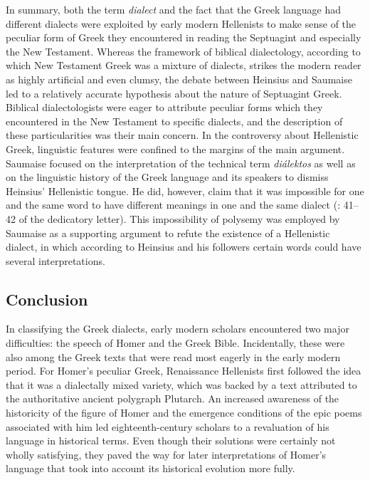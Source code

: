 \documentclass[output=paper]{langsci/langscibook}
\begin{document}
In summary, both the term \textit{dialect} and the fact that the Greek language had different dialects were exploited by early modern Hellenists to make sense of the peculiar form of Greek they encountered in reading the Septuagint and especially the New Testament. Whereas the framework of biblical dialectology, according to which New Testament Greek was a mixture of dialects, strikes the modern reader as highly artificial and even clumsy, the debate between Heinsius and Saumaise led to a relatively accurate hypothesis about the nature of Septuagint Greek. Biblical dialectologists were eager to attribute peculiar forms which they encountered in the New Testament to specific dialects, and the description of these particularities was their main concern. In the controversy about Hellenistic Greek, linguistic features were confined to the margins of the main argument. Saumaise focused on the interpretation of the technical term \textit{diálektos} as well as on the linguistic history of the Greek language and its speakers to dismiss Heinsius’ Hellenistic tongue. He did, however, claim that it was impossible for one and the same word to have different meanings in one and the same dialect (\citealt{Saumaise1643a}: 41–42 of the dedicatory letter). This impossibility of polysemy was employed by Saumaise as a supporting argument to refute the existence of a Hellenistic dialect, in which according to Heinsius and his followers certain words could have several interpretations.

\subsection{Conclusion}
\hypertarget{Toc19704833}{}
In classifying the Greek dialects, early modern scholars encountered two major difficulties: the speech of Homer and the Greek Bible. Incidentally, these were also among the Greek texts that were read most eagerly in the early modern period. For Homer’s peculiar Greek, Renaissance Hellenists first followed the idea that it was a dialectally mixed variety, which was backed by a text attributed to the authoritative ancient polygraph Plutarch. An increased awareness of the historicity of the figure of Homer and the emergence conditions of the epic poems associated with him led eighteenth-century scholars to a revaluation of his language in historical terms. Even though their solutions were certainly not wholly satisfying, they paved the way for later interpretations of Homer’s language that took into account its historical evolution more fully.
\end{document}
